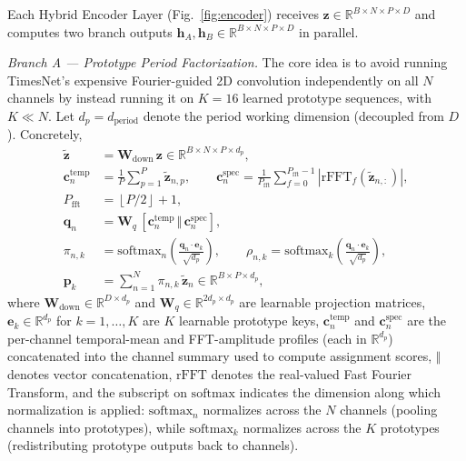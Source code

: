 \documentclass[10pt,journal]{IEEEtran}
\begin{document}
Each Hybrid Encoder Layer (Fig.~\ref{fig:encoder}) receives $\bm{z} \in \mathbb{R}^{B \times N \times P \times D}$ and computes two branch outputs $\bm{h}_A, \bm{h}_B \in \mathbb{R}^{B \times N \times P \times D}$ in parallel.

\emph{Branch A --- Prototype Period Factorization.} The core idea is to avoid running TimesNet's expensive Fourier-guided 2D convolution independently on all $N$ channels by instead running it on $K = 16$ learned prototype sequences, with $K \ll N$. Let $d_p = d_{\mathrm{period}}$ denote the period working dimension (decoupled from $D$). Concretely,
\begin{align}
\label{eq:down_proj}
\tilde{\bm{z}} &= \bm{W}_{\mathrm{down}}\,\bm{z} \in \mathbb{R}^{B \times N \times P \times d_p}, \\
\label{eq:channel_summary}
\bm{c}_n^{\mathrm{temp}} &= \frac{1}{P}\sum_{p=1}^{P} \tilde{\bm{z}}_{n,p}, \qquad
\bm{c}_n^{\mathrm{spec}} = \frac{1}{P_{\mathrm{fft}}}\sum_{f=0}^{P_{\mathrm{fft}}-1} \left|\mathrm{rFFT}_f\!\left(\tilde{\bm{z}}_{n,:}\right)\right|, \\
\label{eq:pfft_def}
P_{\mathrm{fft}} &= \left\lfloor P/2 \right\rfloor + 1, \\
\label{eq:query}
\bm{q}_n &= \bm{W}_q\,\left[\bm{c}_n^{\mathrm{temp}} \,\Vert\, \bm{c}_n^{\mathrm{spec}}\right], \\
\label{eq:assignments}
\pi_{n,k} &= \mathrm{softmax}_n\!\left(\frac{\bm{q}_n \cdot \bm{e}_k}{\sqrt{d_p}}\right), \qquad
\rho_{n,k} = \mathrm{softmax}_k\!\left(\frac{\bm{q}_n \cdot \bm{e}_k}{\sqrt{d_p}}\right), \\
\label{eq:pooling}
\bm{p}_k &= \sum_{n=1}^{N} \pi_{n,k}\, \tilde{\bm{z}}_n \in \mathbb{R}^{B \times P \times d_p},
\end{align}
where $\bm{W}_{\mathrm{down}} \in \mathbb{R}^{D \times d_p}$ and $\bm{W}_q \in \mathbb{R}^{2 d_p \times d_p}$ are learnable projection matrices, $\bm{e}_k \in \mathbb{R}^{d_p}$ for $k = 1, \dots, K$ are $K$ learnable prototype keys, $\bm{c}_n^{\mathrm{temp}}$ and $\bm{c}_n^{\mathrm{spec}}$ are the per-channel temporal-mean and FFT-amplitude profiles (each in $\mathbb{R}^{d_p}$) concatenated into the channel summary used to compute assignment scores, $\Vert$ denotes vector concatenation, $\mathrm{rFFT}$ denotes the real-valued Fast Fourier Transform, and the subscript on $\mathrm{softmax}$ indicates the dimension along which normalization is applied: $\mathrm{softmax}_n$ normalizes across the $N$ channels (pooling channels into prototypes), while $\mathrm{softmax}_k$ normalizes across the $K$ prototypes (redistributing prototype outputs back to channels).
\end{document}
